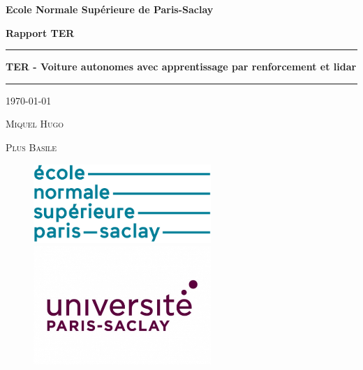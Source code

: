\documentclass[french]{article}
\begin{document}
\begin{center}
    \textbf{\LARGE{Ecole Normale Supérieure de Paris-Saclay}}\\
\end{center}

\vspace{1cm}

\begin{center}
    \textbf{Rapport TER}
\end{center}

\noindent\rule{\textwidth}{0.6mm}
\bigskip
\begin{center}
    \textbf{\LARGE{TER - Voiture autonomes avec apprentissage par renforcement et lidar}}
\end{center}
\bigskip
\noindent\rule{\textwidth}{0.6mm}

\begin{center}
    \today
\end{center}

\bigskip
\begin{center}
    \textsc{Miquel Hugo}
\end{center}
\begin{center}
    \textsc{Plus Basile}
\end{center}

\begin{figure}[b]
    \centering
    \begin{minipage}[h]{0.45\textwidth}
        \raggedright
        \includegraphics[width=0.6\textwidth]{Images/Logo-ENS-Paris-Saclay.png}
    \end{minipage}
    \begin{minipage}[h]{0.45\textwidth}
        \raggedleft
        \includegraphics[width=0.6\textwidth]{Images/Logo-Universite-Paris-Saclay.jpg}
    \end{minipage}
\end{figure}
\end{document}
